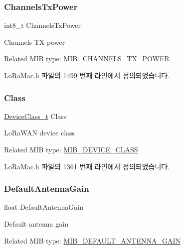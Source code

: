 \subsubsection{\texorpdfstring{Channels\+Tx\+Power}{ChannelsTxPower}}
{\footnotesize\ttfamily int8\+\_\+t Channels\+Tx\+Power}

Channels TX power

Related M\+IB type\+: \mbox{\hyperlink{group___l_o_r_a_m_a_c_gga32ea83d13a3f5bb4b3ec2ace2319ab61ae42f1a0c858ffdb283e0236a24ab6398}{M\+I\+B\+\_\+\+C\+H\+A\+N\+N\+E\+L\+S\+\_\+\+T\+X\+\_\+\+P\+O\+W\+ER}} 

Lo\+Ra\+Mac.\+h 파일의 1499 번째 라인에서 정의되었습니다.

\mbox{\label{unionu_mib_param_a1ca946ebc53171e9f0f1fc39c005a7a6}} 
\subsubsection{\texorpdfstring{Class}{Class}}
{\footnotesize\ttfamily \mbox{\hyperlink{group___l_o_r_a_m_a_c_ga29dc2e097802faaf8fbd0e18ff99695f}{Device\+Class\+\_\+t}} Class}

Lo\+Ra\+W\+AN device class

Related M\+IB type\+: \mbox{\hyperlink{group___l_o_r_a_m_a_c_gga32ea83d13a3f5bb4b3ec2ace2319ab61ac0426517132356c9977dcdafa5ab3a7f}{M\+I\+B\+\_\+\+D\+E\+V\+I\+C\+E\+\_\+\+C\+L\+A\+SS}} 

Lo\+Ra\+Mac.\+h 파일의 1361 번째 라인에서 정의되었습니다.

\mbox{\label{unionu_mib_param_a3679fa4ff6ab120429480da6aa8a017d}} 
\subsubsection{\texorpdfstring{Default\+Antenna\+Gain}{DefaultAntennaGain}}
{\footnotesize\ttfamily float Default\+Antenna\+Gain}

Default antenna gain

Related M\+IB type\+: \mbox{\hyperlink{group___l_o_r_a_m_a_c_gga32ea83d13a3f5bb4b3ec2ace2319ab61afdc28fdfdbed01cb4c4ea59e0c9b9994}{M\+I\+B\+\_\+\+D\+E\+F\+A\+U\+L\+T\+\_\+\+A\+N\+T\+E\+N\+N\+A\+\_\+\+G\+A\+IN}} 

